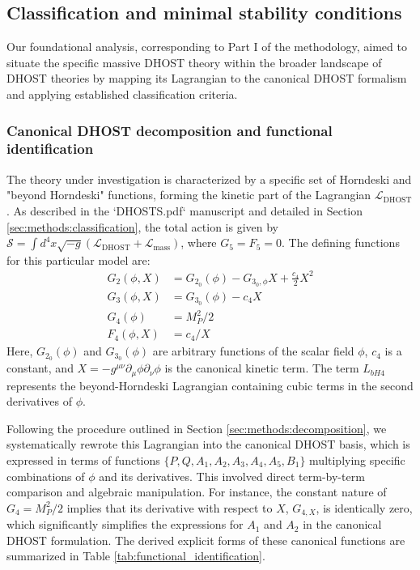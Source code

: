 \documentclass[twocolumn]{aastex631}
\begin{document}
\subsection{Classification and minimal stability conditions}
Our foundational analysis, corresponding to Part I of the methodology, aimed to situate the specific massive DHOST theory within the broader landscape of DHOST theories by mapping its Lagrangian to the canonical DHOST formalism and applying established classification criteria.

\subsubsection{Canonical DHOST decomposition and functional identification}
The theory under investigation is characterized by a specific set of Horndeski and "beyond Horndeski" functions, forming the kinetic part of the Lagrangian $\mathcal{L}_{\text{DHOST}}$. As described in the `DHOSTS.pdf` manuscript and detailed in Section \ref{sec:methods:classification}, the total action is given by $\mathcal{S} = \int d^4x \sqrt{-g} (\mathcal{L}_{\text{DHOST}} + \mathcal{L}_{\text{mass}})$, where $G_5=F_5=0$. The defining functions for this particular model are:
\begin{align*}
G_2(\phi, X) &= G_{2_0}(\phi) - G_{3_0,\phi} X + \frac{c_4}{2} X^2 \\
G_3(\phi, X) &= G_{3_0}(\phi) - c_4 X \\
G_4(\phi) &= M_P^2 / 2 \\
F_4(\phi, X) &= c_4 / X
\end{align*}
Here, $G_{2_0}(\phi)$ and $G_{3_0}(\phi)$ are arbitrary functions of the scalar field $\phi$, $c_4$ is a constant, and $X = -g^{\mu\nu}\partial_\mu\phi\partial_\nu\phi$ is the canonical kinetic term. The term $L_{bH4}$ represents the beyond-Horndeski Lagrangian containing cubic terms in the second derivatives of $\phi$.

Following the procedure outlined in Section \ref{sec:methods:decomposition}, we systematically rewrote this Lagrangian into the canonical DHOST basis, which is expressed in terms of functions $\{P, Q, A_1, A_2, A_3, A_4, A_5, B_1\}$ multiplying specific combinations of $\phi$ and its derivatives. This involved direct term-by-term comparison and algebraic manipulation. For instance, the constant nature of $G_4 = M_P^2/2$ implies that its derivative with respect to $X$, $G_{4,X}$, is identically zero, which significantly simplifies the expressions for $A_1$ and $A_2$ in the canonical DHOST formulation. The derived explicit forms of these canonical functions are summarized in Table \ref{tab:functional_identification}.
\end{document}
